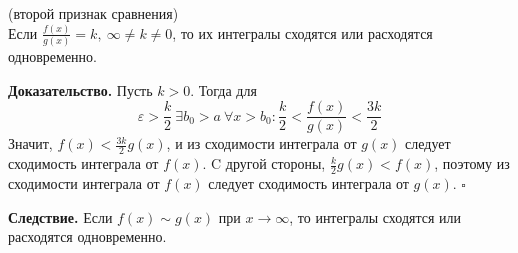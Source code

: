 \begin{theor} (второй признак сравнения)\\
Если $\frac{f(x)}{g(x)}=k,~\infty\ne k\ne0$, то их интегралы сходятся или
расходятся одновременно. 
\end{theor}
\textbf{Доказательство.} Пусть $k>0$. Тогда для
 $$\varepsilon>\frac{k}{2}~\exists b_0>a~\forall x>b_0:\frac{k}{2}<
 \frac{f(x)}{g(x)}<\frac{3k}{2}$$ 
Значит, $f(x)< \frac{3k}{2}g(x)$, и из сходимости интеграла от $g(x)$ следует
сходимость интеграла от $f(x)$. C другой стороны, $\frac{k}{2}g(x)<f(x)$, 
поэтому из сходимости интеграла от $f(x)$ следует сходимость интеграла от 
$g(x)$. $\square$ 

\textbf{Следствие.} Если $f(x)\sim g(x)$ при $x\to \infty$, то интегралы 
сходятся или расходятся одновременно. 




















